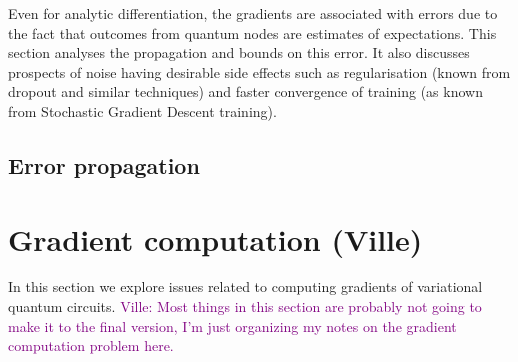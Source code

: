 \documentclass[aps,pra,10pt,twocolumn,groupedaddress,nofootinbib]{revtex4-1}
\theoremstyle{plain}
\newcommand{\ville}[1]{\textcolor{purple}{Ville: #1}}
\begin{document}
Even for analytic differentiation, the gradients are   associated with errors due to the fact that outcomes from quantum nodes are estimates of expectations. This section analyses the propagation and bounds on this error. It also discusses prospects of noise having desirable side effects such as regularisation (known from dropout and similar techniques) and faster convergence of training (as known from Stochastic Gradient Descent training).

\subsection{Error propagation}








%


\appendix




\clearpage
\appendix
\section{Gradient computation (Ville)}

In this section we explore issues related to computing gradients of variational quantum circuits.
\ville{Most things in this section are probably not going to make it to the final version,
I'm just organizing my notes on the gradient computation problem here.}
\end{document}
